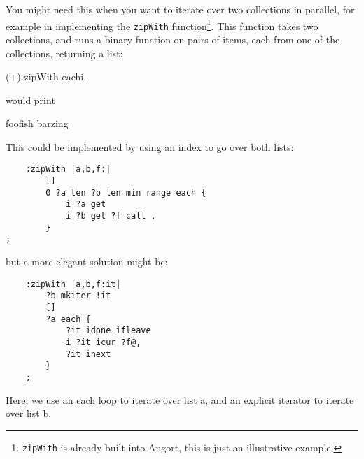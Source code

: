 You might need this when you want to iterate over
two collections in parallel, for example in implementing the \texttt{zipWith}
function\footnote{\texttt{zipWith} is already built into Angort,
this is just an illustrative example.}. This function takes two collections, and runs a binary function on
pairs of items, each from one of the collections, returning a list:

\begin{v}
     (+) zipWith each{i.}
\end{v}
\noindent would print
\begin{v}
    foofish
    barzing
\end{v}
This could be implemented by using an index to go over both lists:

\begin{lstlisting}
    :zipWith |a,b,f:|
        []
        0 ?a len ?b len min range each {
            i ?a get 
            i ?b get ?f call ,
        }
;
\end{lstlisting}
but a more elegant solution might be:
\begin{lstlisting}
    :zipWith |a,b,f:it|
        ?b mkiter !it
        []
        ?a each {
            ?it idone ifleave
            i ?it icur ?f@,
            ?it inext 
        }
    ;
\end{lstlisting}
Here, we use an each loop to iterate over list a, and an explicit
iterator to iterate over list b.
